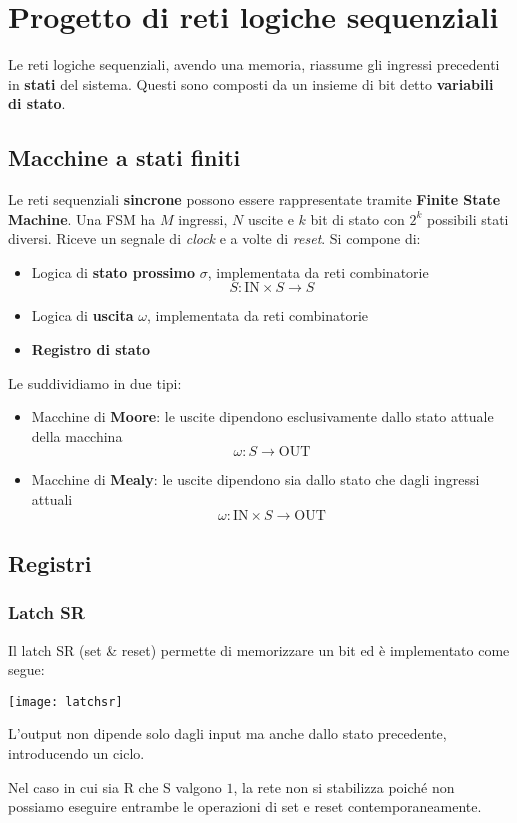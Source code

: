 \newpage
\section{Progetto di reti logiche sequenziali}
Le reti logiche sequenziali, avendo una memoria, riassume gli ingressi precedenti in \textbf{stati} del sistema. Questi sono composti da un insieme di bit detto \textbf{variabili di stato}.

\subsection{Macchine a stati finiti}
Le reti sequenziali \textbf{sincrone} possono essere rappresentate tramite \textbf{Finite State Machine}. Una FSM ha $M$ ingressi, $N$ uscite e $k$ bit di stato con $2^k$ possibili stati diversi. Riceve un segnale di \textit{clock} e a volte di \textit{reset}. Si compone di:
\begin{itemize}
	\item Logica di \textbf{stato prossimo} $\sigma$, implementata da reti combinatorie
	\begin{equation*}
		S: \text{IN} \times S \to S
	\end{equation*}
	\item Logica di \textbf{uscita} $\omega$, implementata da reti combinatorie
	\item \textbf{Registro di stato}
\end{itemize}
Le suddividiamo in due tipi:
\begin{itemize}
	\item Macchine di \textbf{Moore}: le uscite dipendono esclusivamente dallo stato attuale della macchina
	\begin{equation*}
		\omega: S \to \text{OUT}
	\end{equation*}
	\item Macchine di \textbf{Mealy}: le uscite dipendono sia dallo stato che dagli ingressi attuali
	\begin{equation*}
		\omega: \text{IN} \times S \to \text{OUT}
	\end{equation*}
\end{itemize}

\subsection{Registri}
\subsubsection{Latch SR}
Il latch SR (set \& reset) permette di memorizzare un bit ed è implementato come segue:
\begin{center}
	\texttt{[image: latchsr]}
\end{center}
L'output non dipende solo dagli input ma anche dallo stato precedente, introducendo un ciclo.
\begin{observation}
	Nel caso in cui sia R che S valgono $1$, la rete non si stabilizza poiché non possiamo eseguire entrambe le operazioni di set e reset contemporaneamente.
\end{observation}

